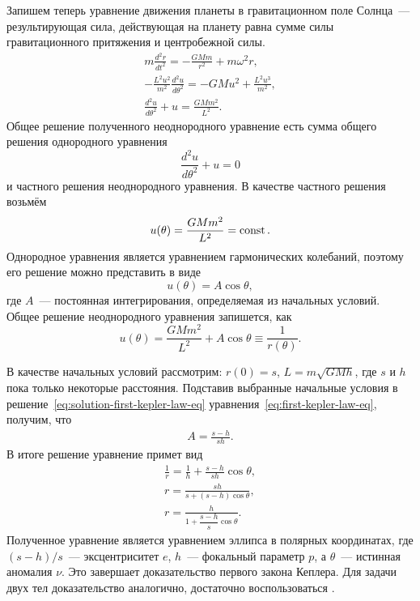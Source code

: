 Запишем теперь уравнение движения планеты в гравитационном поле Солнца~--- результирующая сила, действующая на планету равна сумме силы гравитационного притяжения и центробежной силы.
\begin{gather}
	m \frac{d^2 r}{d t^2} = - \frac{G M m}{r^2} + m \omega^2 r, \nonumber \\
	- \frac{L^2	 u^2}{m^2} \frac{d^2 u}{d \theta^2} = - GMu^2 + \frac{L^2 u^3}{m^2}, \nonumber\\
	\frac{d^2 u}{d \theta^2} + u = \frac{GM m^2}{L^2}. \label{eq:first-kepler-law-eq}
\end{gather}
Общее решение полученного неоднородного уравнение есть сумма общего решения однородного уравнения 
\begin{equation*}
	\frac{d^2 u}{d \theta^2} + u = 0
\end{equation*}
и частного решения неоднородного уравнения. В качестве частного решения возьмём 
\begin{equation*}
	u(\theta) = \frac{GM m^2}{L^2} = \operatorname{const}.
\end{equation*}
Однородное уравнения является уравнением гармонических колебаний, поэтому его решение можно представить в виде
\begin{equation*}
	u(\theta) = A \cos \theta,	
\end{equation*}
где $A$~--- постоянная интегрирования, определяемая из начальных условий. Общее решение неоднородного уравнения запишется, как
\begin{equation}
	u(\theta) = \frac{GM m^2}{L^2} + A \cos \theta \equiv \frac{1}{r(\theta)}.
	\label{eq:solution-first-kepler-law-eq}
\end{equation}

В качестве начальных условий рассмотрим: $r(0) = s$, $L = m\sqrt{G M h}$, где $s$ и $h$ пока только некоторые расстояния. Подставив выбранные начальные условия в решение~\eqref{eq:solution-first-kepler-law-eq} уравнения~\eqref{eq:first-kepler-law-eq}, получим, что
\begin{gather*}
	A = \frac{s - h}{sh}.
\end{gather*}
В итоге решение уравнение примет вид
\begin{gather*}
	\frac{1}{r} = \frac{1}{h} + \frac{s - h}{sh} \cos \theta,\\
	r = \frac{sh}{s + (s - h) \cos \theta},\\
	r = \frac{h}{1 + \dfrac{s - h}{s} \cos \theta}.
\end{gather*}
Полученное уравнение является уравнением эллипса в полярных координатах, где $(s - h)/s$~--- эксцентриситет $e$, $h$~--- фокальный параметр $p$, а $\theta$~--- истинная аномалия $\nu$. Это завершает доказательство первого закона Кеплера. Для задачи двух тел доказательство аналогично, достаточно воспользоваться .

